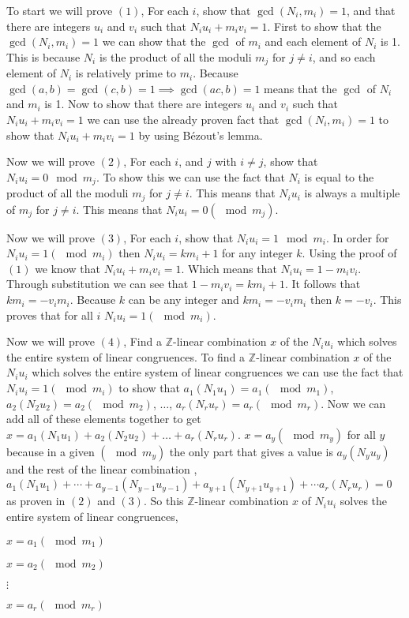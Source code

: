 \documentclass[12pt]{article}
\begin{document}
To start we will prove $(1)$, For each $i$, show that $\gcd (N_i, m_i) = 1$, 
and that there are integers $u_i$ and $v_i$ such that $N_i u_i + m_i v_i = 1$.
First to show that the $\gcd (N_i, m_i) = 1$ we can show that the $\gcd$ of $m_i$ and 
each element of $N_i$ is 1. This is because $N_i$ is the product of all the
moduli $m_j$ for $j \neq i$, and so each element of $N_i$ is relatively prime to $m_i$.
Because $\gcd(a,b) = \gcd(c,b) = 1 \implies \gcd(ac,b) = 1$ means that the $\gcd$ of $N_i$ and $m_i$ is 1.
Now to show that there are integers $u_i$ and $v_i$ such that $N_i u_i + m_i v_i = 1$ we can use the already
proven fact that $\gcd (N_i, m_i) = 1$ to show that $N_i u_i + m_i v_i = 1$ by using Bézout's lemma.

Now we will prove $(2)$, For each $i$, and $j$ with $i\neq j$, 
show that $N_i u_i = 0 \mod m_j$.
To show this we can use the fact that $N_i$ is equal to the product of all 
the moduli $m_j$ for $j \neq i$. This means that $N_i u_i$ is always a multiple
of $m_j$ for $j \neq i$. This means that $N_i u_i = 0 (\mod m_j)$.

Now we will prove $(3)$, For each $i$, show that $N_i u_i = 1 \mod m_i$.
In order for $N_i u_i = 1 (\mod m_i)$ then $N_i u_i = k m_i + 1$ 
for any integer $k$. Using the proof of $(1)$ we know that $N_i u_i + m_i v_i = 1$.
Which means that $N_i u_i = 1 - m_i v_i$. Through substitution we can see that
$1 - m_i v_i = k m_i + 1$. It follows that $k m_i = -v_i m_i$. Because $k$ can
be any integer and $k m_i = -v_i m_i$ then $k = -v_i$. This proves that for all $i$
$N_i u_i = 1 (\mod m_i)$.


Now we will prove $(4)$, Find a $\mathbb{Z}$-linear combination $x$ of 
the $N_i u_i$ which solves the entire system of linear congruences.
To find a $\mathbb{Z}$-linear combination $x$ of the $N_i u_i$ which solves the entire system of linear congruences
we can use the fact that $N_i u_i = 1 (\mod m_i)$ to show that $a_1(N_1 u_1) = a_1 (\mod m_1)$, $a_2(N_2 u_2) = a_2 (\mod m_2)$, $\ldots$, $a_r(N_r u_r) = a_r (\mod m_r)$.
Now we can add all of these elements together to get $x = a_1(N_1 u_1) + a_2(N_2 u_2) + \ldots + a_r(N_r u_r)$.
$x = a_y (\mod m_y)$ for all $y$ because in a given $(\mod m_y)$ 
the only part that gives a value is $a_y(N_y u_y)$ and the rest of the linear combination
, $a_1(N_1 u_1) + \cdots + a_{y-1}(N_{y-1} u_{y-1}) + a_{y+1}(N_{y+1} u_{y+1}) + \cdots a_r(N_r u_r) = 0$ as proven in $(2)$ and $(3)$.
So this $\mathbb{Z}$-linear combination $x$ of $N_i u_i$
solves the entire system of linear congruences, 
\begin{center}
    $x = a_1 (\mod m_1)$

    $x = a_2 (\mod m_2)$

    $\vdots$

    $x = a_r (\mod m_r)$
\end{center}
\end{document}
